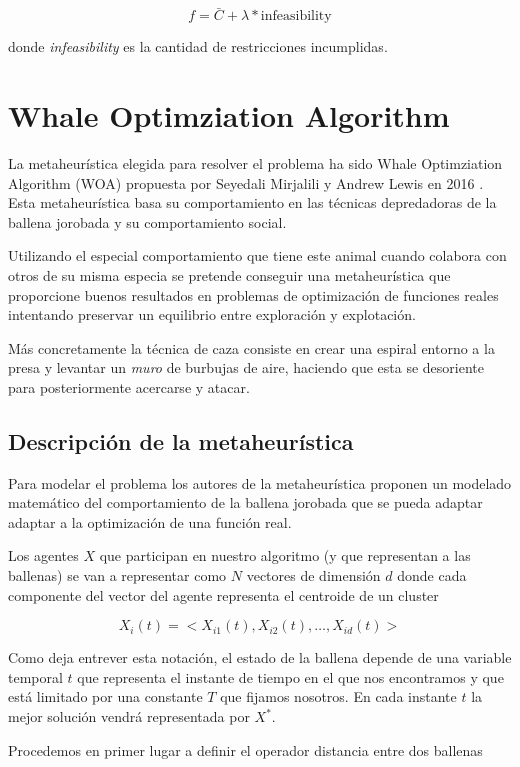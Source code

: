 \documentclass[11pt]{article}
\begin{document}
\[
  f = \bar C + \lambda * \text{infeasibility}
\]

donde \textit{infeasibility} es la cantidad de restricciones incumplidas.

\section{Whale Optimziation Algorithm}

La metaheurística elegida para resolver el problema ha sido Whale Optimziation
Algorithm (WOA) propuesta por Seyedali Mirjalili y Andrew Lewis en 2016 \cite{woa}. Esta
metaheurística basa su comportamiento en las técnicas depredadoras de la ballena
jorobada y su comportamiento social. 

Utilizando el especial comportamiento que tiene este animal cuando colabora con 
otros de su misma especia se pretende conseguir una metaheurística que proporcione
buenos resultados en problemas de optimización de funciones reales intentando 
preservar un equilibrio entre exploración y explotación.

Más concretamente la técnica de caza consiste en crear una espiral entorno a la 
presa y levantar un \textit{muro} de burbujas de aire, haciendo que esta se desoriente
para posteriormente acercarse y atacar. 

\subsection{Descripción de la metaheurística}

Para modelar el problema los autores de la metaheurística proponen un modelado 
matemático del comportamiento de la ballena jorobada que se pueda adaptar adaptar 
a la optimización de una función real.

Los agentes $X$ que participan en nuestro algoritmo (y que representan a las
ballenas) se van a representar como $N$ vectores de dimensión $d$ donde cada
componente del vector del agente representa el centroide de un cluster

\[
    X_i(t) = <X_{i1}(t), X_{i2}(t), \dots, X_{id}(t)>
\]

Como deja entrever esta notación, el estado de la ballena depende de una variable 
temporal $t$ que representa el instante de tiempo en el que nos encontramos y 
que está limitado por una constante $T$ que fijamos nosotros. En cada instante 
$t$ la mejor solución vendrá representada por $X^*$.

Procedemos en primer lugar a definir el operador distancia entre dos ballenas
\end{document}
